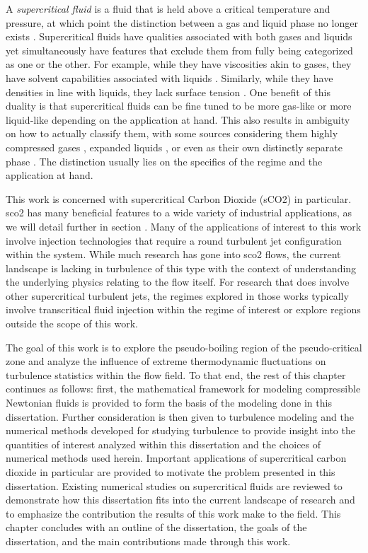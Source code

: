 A \textit{supercritical fluid} is a fluid that is held above a critical temperature and pressure, at which point the distinction between a gas and liquid phase no longer exists \cite{SCF2, SCF1}. Supercritical fluids have qualities associated with both gases and liquids yet simultaneously have features that exclude them from fully being categorized as one or the other. For example, while they have viscosities akin to gases, they have solvent capabilities associated with liquids \cite{}. Similarly, while they have densities in line with liquids, they lack surface tension \cite{}. One benefit of this duality is that supercritical fluids can be fine tuned to be more gas-like or more liquid-like depending on the application at hand. This also results in ambiguity on how to actually classify them, with some sources considering them highly compressed gases \cite{Gordon}, expanded liquids \cite{Aggarwal}, or even as their own distinctly separate phase \cite{BANUTI201512}. The distinction usually lies on the specifics of the regime and the application at hand. 

This work is concerned with supercritical Carbon Dioxide (sCO2) in particular. \gls{sco2} has many beneficial features to a wide variety of industrial applications, as we will detail further in section \cite{}. Many of the applications of interest to this work involve injection technologies that require a round turbulent jet configuration within the system. While much research has gone into \gls{sco2} flows, the current landscape is lacking in turbulence of this type with the context of understanding the underlying physics relating to the flow itself. For research that does involve other supercritical turbulent jets, the regimes explored in those works typically involve transcritical fluid injection within the regime of interest or explore regions outside the scope of this work. 

The goal of this work is to explore the pseudo-boiling region of the pseudo-critical zone and analyze the influence of extreme thermodynamic fluctuations on turbulence statistics within the flow field. To that end, the rest of this chapter continues as follows: first, the mathematical framework for modeling compressible Newtonian fluids is provided to form the basis of the modeling done in this dissertation. Further consideration is then given to turbulence modeling and the numerical methods developed for studying turbulence to provide insight into the quantities of interest analyzed within this dissertation and the choices of numerical methods used herein. Important applications of supercritical carbon dioxide in particular are provided to motivate the problem presented in this dissertation. Existing numerical studies on supercritical fluids are reviewed to demonstrate how this dissertation fits into the current landscape of research and to emphasize the contribution the results of this work make to the field. This chapter concludes with an outline of the dissertation, the goals of the dissertation, and the main contributions made through this work. 

